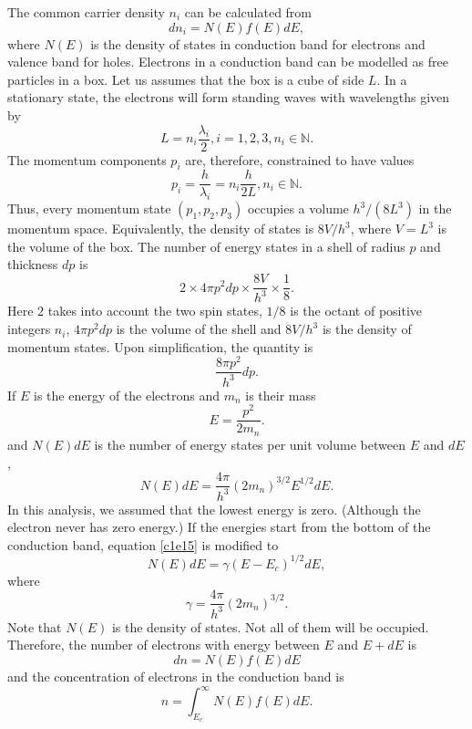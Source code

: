 The common carrier density $n_i$ can be calculated from
\begin{equation}\label{c1e14}
dn_i = N(E)f(E)dE,
\end{equation}
where $N(E)$ is the density of states in conduction band for electrons and
valence band for holes. Electrons in a conduction band can be modelled as
free particles in a box. Let us assumes that the box is a cube of side $L$.
In a stationary state, the electrons will form standing waves with wavelengths
given by
\[
L = n_i\frac{\lambda_i}{2}, i = 1, 2, 3, n_i \in \mathbb{N}.
\]
The momentum components $p_i$ are, therefore, constrained to have values
\[
p_i = \frac{h}{\lambda_i} = n_i\frac{h}{2L}, n_i \in \mathbb{N}.
\]
Thus, every momentum state $(p_1, p_2, p_3)$ occupies a volume $h^3/(8L^3)$ in
the momentum space. Equivalently, the density of states is $8V/h^3$, where
$V = L^3$ is the volume of the box. The number of energy states in a shell of 
radius $p$ and thickness $dp$ is
\[
2 \times 4\pi p^2 dp \times \frac{8V}{h^3} \times \frac{1}{8}.
\]
Here $2$ takes into account the two spin states, $1/8$ is the octant of 
positive integers $n_i$, $4\pi p^2 dp$ is the volume of the shell and $8V/h^3$
is the density of momentum states. Upon simplification, the quantity is
\[
\frac{8\pi p^2}{h^3}dp.
\] 
If $E$ is the energy of the electrons and $m_n$ is their mass
\[
E = \frac{p^2}{2m_n}.
\]
and $N(E)dE$ is the number of energy states per unit volume between $E$ and
$dE$,
\begin{equation}\label{c1e15}
N(E)dE = \frac{4\pi}{h^3}(2m_n)^{3/2}E^{1/2}dE.
\end{equation}
In this analysis, we assumed that the lowest energy is zero. (Although the 
electron never has zero energy.) If the energies start from the bottom of the
conduction band, equation \eqref{c1e15} is modified to
\begin{equation}\label{c1e16}
N(E)dE = \gamma(E - E_c)^{1/2}dE,
\end{equation}
where 
\begin{equation}\label{c1e17}
\gamma = \frac{4\pi}{h^3}(2m_n)^{3/2}.
\end{equation}
Note that $N(E)$ is the density of states. Not all of them will be occupied.
Therefore, the number of electrons with energy between $E$ and $E + dE$ is
\begin{equation}\label{c1e18}
dn = N(E)f(E)dE
\end{equation}
and the concentration of electrons in the conduction band is
\begin{equation}\label{c1e19}
n = \int_{E_c}^\infty N(E)f(E)dE.
\end{equation}
